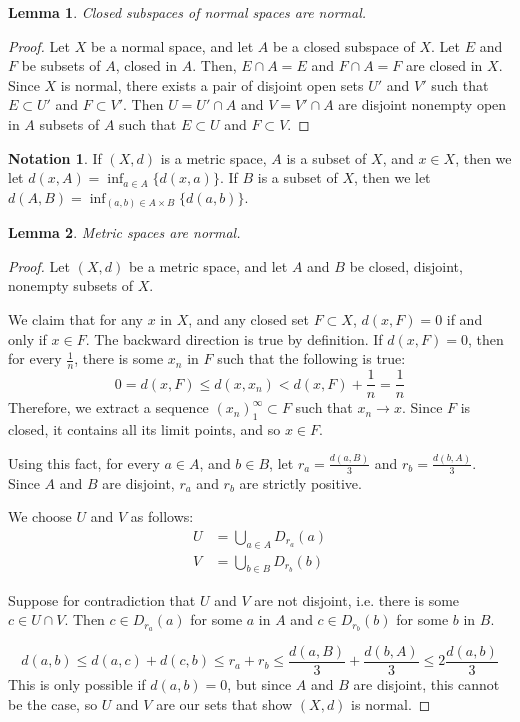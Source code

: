 \documentclass[openany, amssymb, psamsfonts]{amsart}
\newtheorem{lem}{Lemma}[section]
\theoremstyle{definition}
\newtheorem{notn}{Notation}[section]
\numberwithin{equation}{section}
\begin{document}
\begin{lem}\label{lem:3.7}
  Closed subspaces of normal spaces are normal.
\end{lem}
\begin{proof}
  Let $X$ be a normal space, and let $A$ be a closed subspace of $X$. Let $E$ and $F$ be subsets of $A$, closed in $A$. Then, $E\cap A = E$ and $F\cap A = F$ are closed in $X$. Since $X$ is normal, there exists a pair of disjoint open sets $U'$ and $V'$ such that $E \subset U'$ and $F\subset V'$. Then $U = U'\cap A$ and $V = V' \cap A$ are disjoint nonempty open in $A$ subsets of $A$ such that $E \subset U$ and $F \subset V$. 
\end{proof}
\begin{notn}
  If $(X,d)$ is a metric space, $A$ is a subset of $X$, and $x \in X$, then we let $d(x, A) = \inf_{a \in A}\{d(x,a)\}$. If $B$ is a subset of $X$, then we let $d(A,B) = \inf_{(a,b) \in A\times B}\{d(a,b)\}$. 
\end{notn}
\begin{lem}\label{lem:3.8}
  Metric spaces are normal.
\end{lem}
\begin{proof}
  Let $(X,d)$ be a metric space, and let $A$ and $B$ be closed, disjoint, nonempty subsets of $X$. 

  We claim that for any $x$ in $X$, and any closed set $F\subset X$, $d(x, F) = 0$ if and only if $x \in F$. The backward direction is true by definition. If $d(x,F) = 0$, then for every $\frac1{n}$, there is some $x_n$ in $F$ such that the following is true:
  \[
    0 = d(x,F) \le d(x, x_n) < d(x,F) + \frac{1}{n} = \frac1{n}
  \]
  Therefore, we extract a sequence $(x_n)_1^\infty \subset F$ such that $x_n \to x$. Since $F$ is closed, it contains all its limit points, and so $x \in F$. 

  Using this fact, for every $a \in A$, and $b \in B$, let $r_a = \frac{d(a, B)}{3}$ and $r_b = \frac{d(b, A)}{3}$. Since $A$ and $B$ are disjoint, $r_a$ and $r_b$ are strictly positive. 

  We choose $U$ and $V$ as follows: 
  \begin{align*}
    U &= \bigcup_{a\in A} D_{r_a}(a)\\
    V &= \bigcup_{b\in B} D_{r_b}(b)
  \end{align*}

  Suppose for contradiction that $U$ and $V$ are not disjoint, i.e. there is some $c \in U\cap V$. Then $c \in D_{r_a}(a)$ for some $a$ in $A$ and $c \in D_{r_b}(b)$ for some $b$ in $B$. 

  \[
    d(a,b) \le d(a, c) + d(c, b) \le r_a + r_b \le \frac{d(a, B)}3 + \frac{d(b, A)}3 \le 2\frac{d(a,b)}3
  \]
  This is only possible if $d(a,b) = 0$, but since $A$ and $B$ are disjoint, this cannot be the case, so $U$ and $V$ are our sets that show $(X,d)$ is normal.
\end{proof}
\end{document}
